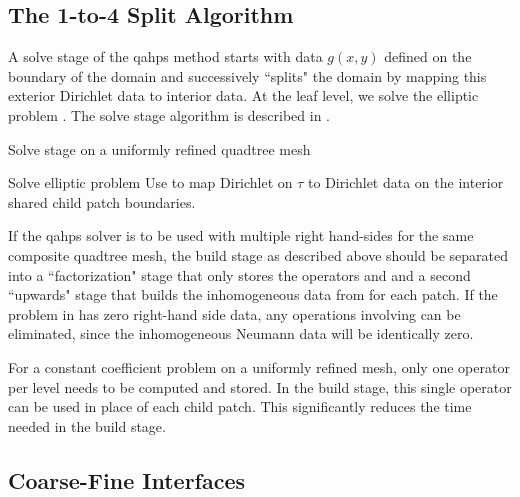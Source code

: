 \subsection{The 1-to-4 Split Algorithm}
\label{sub:1-to-2-split-algorithm}

A solve stage of the \gls{qahps} method starts with data $g(x,y)$ defined on the boundary of the domain and successively ``splits" the domain by mapping this exterior Dirichlet data to interior data.  At the leaf level, we solve the elliptic problem . The solve stage algorithm is described in .
\begin{algorithm}[H]
    \caption{Solve stage on a uniformly refined quadtree mesh}
    \begin{algorithmic}[0]
         
                \State Solve elliptic problem 
            \Else{} 
                \State Use  to map Dirichlet \gext on $\tau$ to Dirichlet data \gint on the interior shared child patch boundaries.
            \EndIf
        \EndFor
    \end{algorithmic}
    \label{alg:solve_uniform}
\end{algorithm}

\begin{remark}
    If the \gls{qahps} solver is to be used with multiple right hand-sides for the same composite quadtree mesh, the build stage as described above should be separated into a ``factorization" stage that only stores the operators \Ttau and \Stau and a second ``upwards" stage that builds the inhomogeneous data \wtau from \htau for each patch. If the problem in  has zero right-hand side data, any operations involving \htau can be eliminated, since the inhomogeneous Neumann data will be identically zero.
\end{remark}

\begin{remark}
    For a constant coefficient problem on a uniformly refined mesh, only one operator \Ttau per level needs to be computed and stored. In the build stage, this single operator can be used in place of each child patch. This significantly reduces the time needed in the build stage.
\end{remark}

\subsection{Coarse-Fine Interfaces}
\label{sub:mesh_adaptivity}

